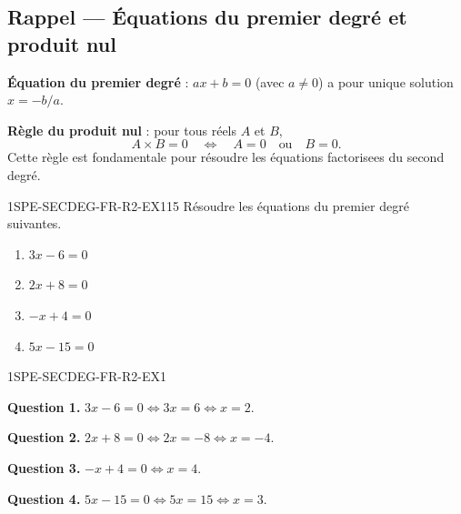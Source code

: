 

\subsection*{Rappel — Équations du premier degré et produit nul}

\textbf{Équation du premier degré} : $ax + b = 0$ (avec $a
\neq 0$) a pour unique solution $x = -b/a$.

\textbf{Règle du produit nul} : pour tous réels $A$ et $B$,
\[
  A \times B = 0 \quad \Longleftrightarrow \quad A = 0 \quad \text{ou} \quad B = 0.
\]
Cette règle est fondamentale pour résoudre les équations factorisees du second degré.


\begin{exercice}{1SPE-SECDEG-FR-R2-EX1}{1}{5}
Résoudre les équations du premier degré suivantes.
\begin{enumerate}
  \item $3x - 6 = 0$
  \item $2x + 8 = 0$
  \item $-x + 4 = 0$
  \item $5x - 15 = 0$
\end{enumerate}
\end{exercice}


\begin{corrige}{1SPE-SECDEG-FR-R2-EX1}


\textbf{Question 1.} $3x - 6 = 0 \Leftrightarrow 3x = 6 \Leftrightarrow x = 2$.

\textbf{Question 2.} $2x + 8 = 0 \Leftrightarrow 2x = -8 \Leftrightarrow x = -4$.

\textbf{Question 3.} $-x + 4 = 0 \Leftrightarrow x = 4$.

\textbf{Question 4.} $5x - 15 = 0 \Leftrightarrow 5x = 15 \Leftrightarrow x = 3$.

\end{corrige}

